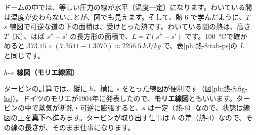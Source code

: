 ドームの中では、等しい圧力の線が水平（温度一定）になります。わいている間は温度が変わらないことが、図でも見えます。そして、熱-6 で学んだように、$T$-$s$ 線図で可逆な道の下の面積は、受けとった熱です。わいている間の熱は、高さ $T$〔K〕、はば $s''-s'$ の長方形の面積で、$L=T(s''-s')$ です。\qty{100}{\celsius}で確かめると $373.15\times(7.3541-1.3070)\approx\qty{2256.5}{kJ/kg}$ で、表\ref{ph:熱-8:tab-ps}の $L$ と同じです。

\noindent\textbf{$h$-$s$ 線図（モリエ線図）}\par\nobreak
タービンの計算では、縦に $h$、横に $s$ をとった線図が便利です（図\ref{ph:熱-8:fig-hs}）。ドイツのモリエが1904年に発表したので、\textbf{モリエ線図}ともいいます。タービンの中で蒸気が断熱・可逆に膨張すると、$s$ は一定（熱-6）なので、状態は線図の上を\textbf{真下}へ進みます。タービンが取り出す仕事は $h$ の差（熱-4）なので、その線の\textbf{長さ}が、そのまま仕事になります。
